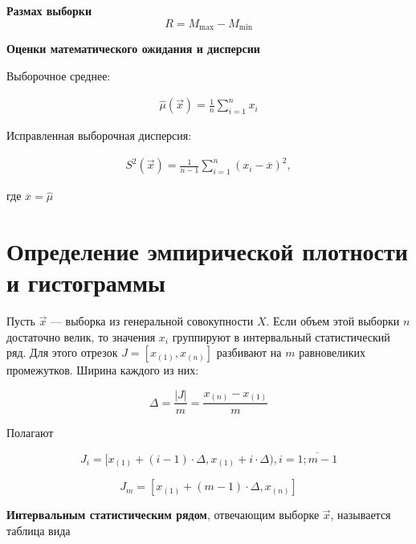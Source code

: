 \textbf{Размах выборки}
\begin{equation}
    R = M_{\max} - M_{\min}
\end{equation}

\textbf{Оценки математического ожидания и дисперсии}

Выборочное среднее:

\begin{equation}
    \begin{aligned}
    \hat \mu(\vec x) = \frac{1}{n} \sum_{i=1}^n x_i
    \end{aligned}
\end{equation}

Исправленная выборочная дисперсия:

\begin{equation}
    \begin{aligned}
    S^2(\vec x) = \frac{1}{n-1} \sum_{i=1}^n (x_i - \overline x)^2,
    \end{aligned}
\end{equation}

где $ \overline{x} = \hat \mu $

\section{Определение эмпирической плотности и гистограммы}

Пусть $\vec x$ --- выборка из генеральной совокупности $X$. Если объем этой выборки $n$ достаточно велик, то значения $x_i$ группируют в интервальный статистический ряд. Для этого отрезок $J = [x_{(1)}, x_{(n)}]$ разбивают на $m$ равновеликих промежутков. Ширина каждого из них:

\begin{equation}
    \Delta = \frac{|J|}{m} = \frac{x_{(n)} - x_{(1)}}{m}
\end{equation}

Полагают

\begin{equation}
    J_i = [x_{(1)} + (i - 1) \cdot \Delta, x_{(1)} + i \cdot \Delta), i = \overline{1; m - 1}
\end{equation}

\begin{equation}
    J_{m} = [x_{(1)} + (m - 1) \cdot \Delta, x_{(n)}]
\end{equation}

\textbf{Интервальным статистическим рядом}, отвечающим выборке $\vec x$, называется таблица вида


